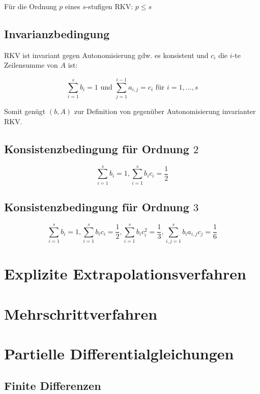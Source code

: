 Für die Ordnung $p$ eines $s$-stufigen RKV: $p \leq s$

\subsection*{Invarianzbedingung}

RKV ist invariant gegen Autonomisierung gdw. es konsistent und $c_i$ die $i$-te Zeilensumme von $A$ ist:

$$\sum_{i=1}^s b_i = 1 \text{ und } \sum_{j=1}^{i-1} a_{i,j} = c_i \text{ für } i=1,\dots,s$$

Somit genügt $(b, A)$ zur Definition von gegenüber Autonomisierung invarianter RKV.

\subsection*{Konsistenzbedingung für Ordnung $2$}

$$\sum_{i=1}^s b_i = 1 , \sum_{i=1}^s b_i c_i = \frac{1}{2}$$

\subsection*{Konsistenzbedingung für Ordnung $3$}

$$\sum_{i=1}^s b_i = 1 , \sum_{i=1}^s b_i c_i = \frac{1}{2} , \sum_{i=1}^s b_i c_i^2 = \frac{1}{3} , \sum_{i,j=1}^s b_i a_{i,j} c_j = \frac{1}{6}$$

\section*{Explizite Extrapolationsverfahren}

\section*{Mehrschrittverfahren}

\section*{Partielle Differentialgleichungen}

\subsection*{Finite Differenzen}
